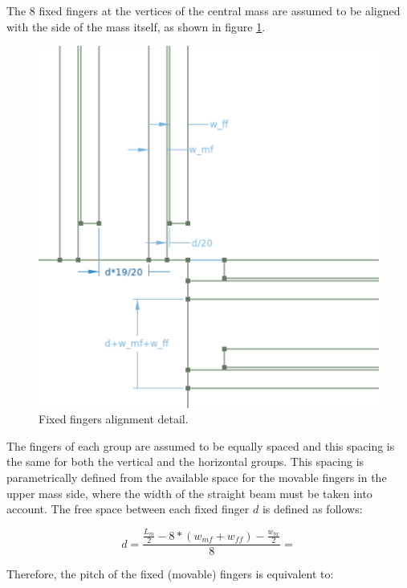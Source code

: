 \documentclass[lettersize,journal]{IEEEtran}
\begin{document}
        The 8 fixed fingers at the vertices of the central mass are assumed to be aligned with the side of the mass itself, as shown in figure \ref{fig:ff-detail}.
        
        \begin{figure}
            \centering
            \includegraphics[width=1.0\linewidth]{device_ff_detail.png}
            \caption{Fixed fingers alignment detail.}
            \label{fig:ff-detail}
        \end{figure}
        
        The fingers of each group are assumed to be equally spaced and this spacing is the same for both the vertical and the horizontal groups. This spacing is parametrically defined from the available space for the movable fingers in the upper mass side, where the width of the straight beam must be taken into account. The free space between each fixed finger \(d\) is defined as follows:
        
        \begin{equation}
            d = \frac{\frac{L_m}{2}-8*(w_{mf}+w_{ff})-\frac{w_{bx}}{2}}{8}=
        \end{equation}
        
        Therefore, the pitch of the fixed (movable) fingers is equivalent to:
        
\end{document}
